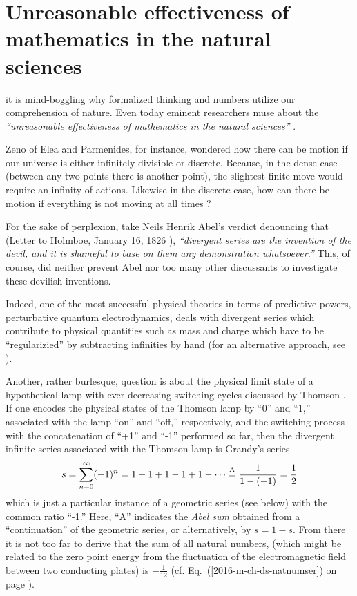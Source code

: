 \chapter{Unreasonable effectiveness of mathematics in the natural sciences}
\label{ch:uens}

 it is mind-boggling why formalized thinking and numbers utilize our comprehension
of nature.
Even today eminent researchers muse about the {\em
``unreasonable effectiveness of mathematics in the natural sciences''} \cite{wigner}.



Zeno of Elea and Parmenides, for instance, wondered how there can be motion if
our universe is either infinitely divisible or discrete.
Because, in the dense case (between any two points there is another point),
the slightest finite move would require an infinity of actions.
Likewise in the discrete case,
how can there be motion if everything is not moving at all times \cite{zeno,benna:62,gruenbaum:68,Sainsbury}?


For the sake of perplexion, take
Neils Henrik Abel's verdict denouncing that
(Letter to Holmboe, January 16, 1826 \cite{Hardy:1949}),
{\em ``divergent series are the invention of the devil, and it is shameful to base on them any demonstration whatsoever.''}
This, of course, did neither prevent Abel nor too many other discussants to investigate these devilish inventions.


Indeed, one of the most successful physical theories in terms of predictive powers,
perturbative quantum electrodynamics,
deals with divergent series \cite{PhysRev.85.631}
which contribute to physical quantities such as mass and charge
which have to be ``regularizied'' by subtracting infinities by hand
(for an alternative approach, see \cite{scharf-finiteQED}).

Another, rather burlesque, question is
about the physical limit state of a hypothetical lamp with ever decreasing switching cycles
discussed by Thomson \cite{thom:54}.
If one encodes the physical states of the Thomson lamp by ``0'' and ``1,''
associated with the lamp ``on'' and ``off,'' respectively,
and the switching process with the concatenation of ``+1'' and ``-1'' performed so far, then
the divergent infinite series associated with the Thomson lamp is
Grandy's series
\begin{equation}
s = \sum_{n=0}^\infty (-1)^n=1-1+1-1+1-\cdots \stackrel{{\rm A}}{=} \frac{1}{1-(-1)}= \frac{1}{2}
\label{2009-fiftyfifty-1}
\end{equation}
which is just a particular instance of a geometric series (see below) with the common ratio ``-1.''
Here, ``A'' indicates the
{\em  Abel sum}
\cite{Hardy:1949} obtained from a ``continuation'' of the geometric series, or alternatively, by
$s= 1-s$.
From there it is not too far to derive that the sum of all natural numbers,
(which might be related to the zero point energy from the fluctuation
of the electromagnetic field between two conducting plates) is $-\frac{1}{12}$
(cf. Eq.~(\ref{2016-m-ch-ds-natnumser}) on page
\pageref{2016-m-ch-ds-natnumser}).

